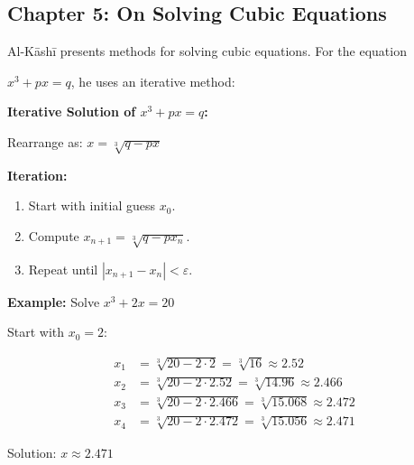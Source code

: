 \documentclass[11pt,a4paper]{article}
\newenvironment{mathalgo}{%

  \par\vspace{0.3cm}

  \begin{framed}

  \setlength{\parindent}{0pt}

}{%

  \end{framed}

  \par\vspace{0.3cm}

}
\begin{document}
\subsection{Chapter 5: On Solving Cubic Equations}



Al-K\=ash\=i presents methods for solving cubic equations. For the equation

$x^3 + px = q$, he uses an iterative method:



\begin{mathalgo}

\textbf{Iterative Solution of $x^3 + px = q$:}



Rearrange as: $x = \sqrt[3]{q - px}$



\textbf{Iteration:}

\begin{enumerate}[nosep]

  \item Start with initial guess $x_0$.

  \item Compute $x_{n+1} = \sqrt[3]{q - p x_n}$.

  \item Repeat until $|x_{n+1} - x_n| < \varepsilon$.

\end{enumerate}



\textbf{Example:} Solve $x^3 + 2x = 20$



Start with $x_0 = 2$:

\begin{align*}

x_1 &= \sqrt[3]{20 - 2 \cdot 2} = \sqrt[3]{16} \approx 2.52 \\

x_2 &= \sqrt[3]{20 - 2 \cdot 2.52} = \sqrt[3]{14.96} \approx 2.466 \\

x_3 &= \sqrt[3]{20 - 2 \cdot 2.466} = \sqrt[3]{15.068} \approx 2.472 \\

x_4 &= \sqrt[3]{20 - 2 \cdot 2.472} = \sqrt[3]{15.056} \approx 2.471

\end{align*}



Solution: $\boxed{x \approx 2.471}$

\end{mathalgo}
\end{document}
